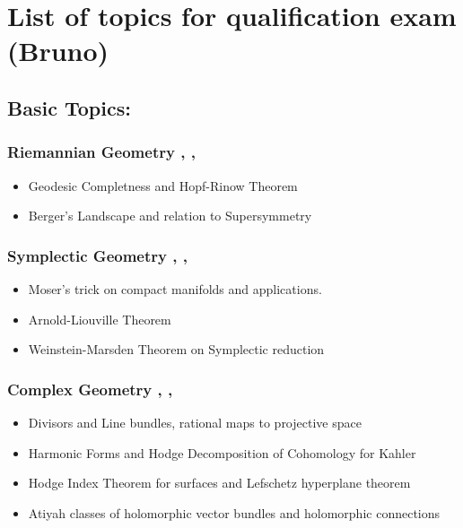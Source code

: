\documentclass{article}
\author{BS}
\begin{document}
\section*{List of topics for qualification exam (Bruno)}
\subsection*{Basic Topics:}
\subsubsection*{Riemannian Geometry \cite{docarmo}, \cite{besse2007einstein}, \cite{jost2008riemannian}}
\begin{itemize}
    \item Geodesic Completness and Hopf-Rinow Theorem
    \item Berger's Landscape and relation to Supersymmetry
\end{itemize}
\subsubsection*{Symplectic Geometry \cite{Arnold}, \cite{guillemin1990symplectic}, \cite{da2001lectures}}
\begin{itemize}
    \item Moser's trick on compact manifolds and applications.
    \item Arnold-Liouville Theorem
    \item Weinstein-Marsden Theorem on Symplectic reduction
\end{itemize}
\subsubsection*{Complex Geometry \cite{huybrechts2005complex}, \cite{griffiths2014principles}, \cite{Voisin_2002}}
\begin{itemize}
	\item Divisors and Line bundles, rational maps to projective space
	\item Harmonic Forms and Hodge Decomposition of Cohomology for Kahler
        \item Hodge Index Theorem for surfaces and Lefschetz hyperplane theorem
	\item Atiyah classes of holomorphic vector bundles and holomorphic connections
\end{itemize}
\end{document}
